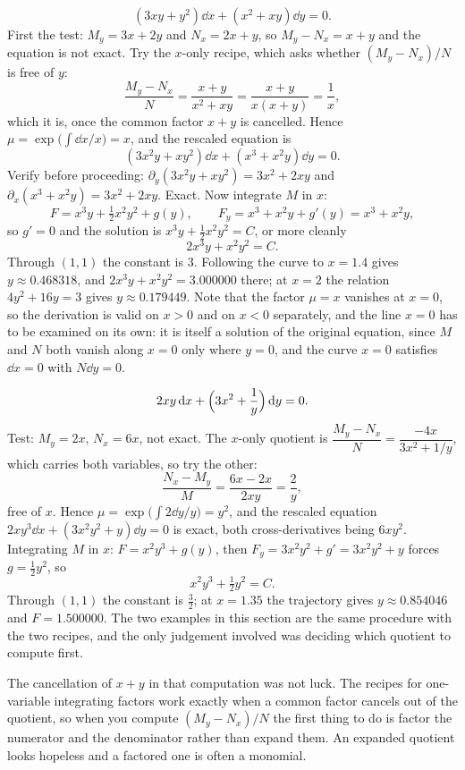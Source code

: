 \begin{worked}
\[(3xy+y^{2})\dd x+(x^{2}+xy)\dd y=0.\]
First the test: $M_y=3x+2y$ and $N_x=2x+y$, so $M_y-N_x=x+y$ and the equation is not exact. Try the $x$-only recipe, which asks whether $(M_y-N_x)/N$ is free of $y$:
\[\frac{M_y-N_x}{N}=\frac{x+y}{x^{2}+xy}=\frac{x+y}{x(x+y)}=\frac{1}{x},\]
which it is, once the common factor $x+y$ is cancelled. Hence $\mu=\exp\bigl(\int\dd x/x\bigr)=x$, and the rescaled equation is
\[(3x^{2}y+xy^{2})\dd x+(x^{3}+x^{2}y)\dd y=0.\]
Verify before proceeding: $\partial_y(3x^{2}y+xy^{2})=3x^{2}+2xy$ and $\partial_x(x^{3}+x^{2}y)=3x^{2}+2xy$. Exact. Now integrate $M$ in $x$:
\[F=x^{3}y+\tfrac12x^{2}y^{2}+g(y),\qquad F_y=x^{3}+x^{2}y+g'(y)=x^{3}+x^{2}y,\]
so $g'=0$ and the solution is $x^{3}y+\tfrac12x^{2}y^{2}=C$, or more cleanly
\[2x^{3}y+x^{2}y^{2}=C.\]
Through $(1,1)$ the constant is $3$. Following the curve to $x=1.4$ gives $y\approx0.468318$, and $2x^{3}y+x^{2}y^{2}=3.000000$ there; at $x=2$ the relation $4y^{2}+16y=3$ gives $y\approx0.179449$. Note that the factor $\mu=x$ vanishes at $x=0$, so the derivation is valid on $x>0$ and on $x<0$ separately, and the line $x=0$ has to be examined on its own: it is itself a solution of the original equation, since $M$ and $N$ both vanish along $x=0$ only where $y=0$, and the curve $x=0$ satisfies $\dd x=0$ with $N\dd y=0$.
\end{worked}

\begin{worked}
\[2xy\,\mathrm{d} x+\Bigl(3x^{2}+\frac{1}{y}\Bigr)\,\mathrm{d} y=0.\]
Test: $M_y=2x$, $N_x=6x$, not exact. The $x$-only quotient is $\dfrac{M_y-N_x}{N}=\dfrac{-4x}{3x^{2}+1/y}$, which carries both variables, so try the other:
\[\frac{N_x-M_y}{M}=\frac{6x-2x}{2xy}=\frac{2}{y},\]
free of $x$. Hence $\mu=\exp\bigl(\int2\dd y/y\bigr)=y^{2}$, and the rescaled equation $2xy^{3}\dd x+(3x^{2}y^{2}+y)\dd y=0$ is exact, both cross-derivatives being $6xy^{2}$. Integrating $M$ in $x$: $F=x^{2}y^{3}+g(y)$, then $F_y=3x^{2}y^{2}+g'=3x^{2}y^{2}+y$ forces $g=\tfrac12y^{2}$, so
\[x^{2}y^{3}+\tfrac12y^{2}=C.\]
Through $(1,1)$ the constant is $\tfrac32$; at $x=1.35$ the trajectory gives $y\approx0.854046$ and $F=1.500000$. The two examples in this section are the same procedure with the two recipes, and the only judgement involved was deciding which quotient to compute first.
\end{worked}

The cancellation of $x+y$ in that computation was not luck. The recipes for one-variable integrating factors work exactly when a common factor cancels out of the quotient, so when you compute $(M_y-N_x)/N$ the first thing to do is factor the numerator and the denominator rather than expand them. An expanded quotient looks hopeless and a factored one is often a monomial.

